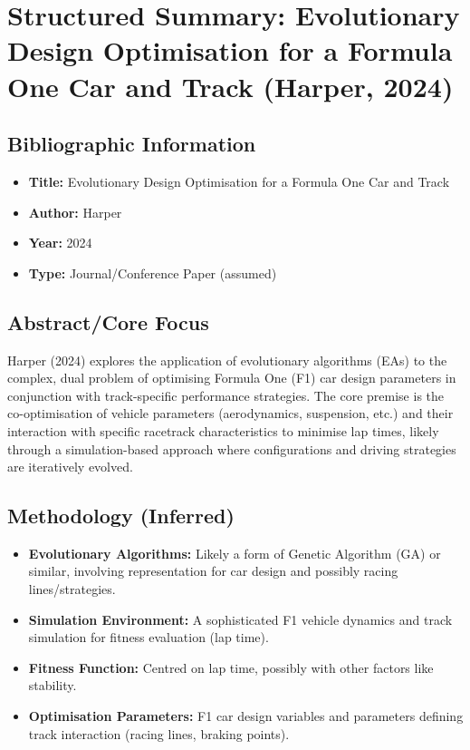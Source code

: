 \section{Structured Summary: Evolutionary Design Optimisation for a Formula One Car and Track (Harper, 2024)}\label{sec:harper-2024-evolutionary}

\subsection{Bibliographic Information}\label{subsec:bibliographic-information}
\begin{itemize}
    \item \textbf{Title:} Evolutionary Design Optimisation for a Formula One Car and Track
    \item \textbf{Author:} Harper
    \item \textbf{Year:} 2024
    \item \textbf{Type:} Journal/Conference Paper (assumed)
\end{itemize}

\subsection{Abstract/Core Focus}\label{subsec:abstract/core-focus}
Harper (2024) explores the application of evolutionary algorithms (EAs) to the complex, dual problem of optimising Formula One (F1) car design parameters in conjunction with track-specific performance strategies.
The core premise is the co-optimisation of vehicle parameters (aerodynamics, suspension, etc.) and their interaction with specific racetrack characteristics to minimise lap times, likely through a simulation-based approach where configurations and driving strategies are iteratively evolved.

\subsection{Methodology (Inferred)}\label{subsec:methodology-(inferred)}
\begin{itemize}
    \item \textbf{Evolutionary Algorithms:} Likely a form of Genetic Algorithm (GA) or similar, involving representation for car design and possibly racing lines/strategies.
    \item \textbf{Simulation Environment:} A sophisticated F1 vehicle dynamics and track simulation for fitness evaluation (lap time).
    \item \textbf{Fitness Function:} Centred on lap time, possibly with other factors like stability.
    \item \textbf{Optimisation Parameters:} F1 car design variables and parameters defining track interaction (racing lines, braking points).
\end{itemize}

